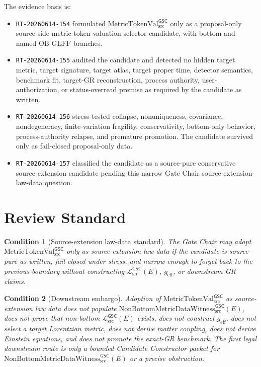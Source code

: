 \documentclass[11pt]{article}
\newcommand{\MetricTokenVal}{\mathrm{MetricTokenVal}_{\mathrm{src}}^{\mathsf{GSC}}}
\newcommand{\MetricData}{\mathcal{L}_{\mathrm{src}}^{\mathsf{GSC}}}
\newcommand{\Witness}{\mathrm{NonBottomMetricDataWitness}_{\mathrm{src}}^{\mathsf{GSC}}}
\newcommand{\OBGEFF}{\mathrm{OB\mbox{-}GEFF}}
\newcommand{\geff}{g_{\mathrm{eff}}}
\newtheorem{condition}{Condition}
\begin{document}
The evidence basis is:
\begin{itemize}[leftmargin=*]
  \item \texttt{RT-20260614-154} formulated \(\MetricTokenVal\) only as a
  proposal-only source-side metric-token valuation selector candidate, with
  bottom and named \(\OBGEFF\) branches.
  \item \texttt{RT-20260614-155} audited the candidate and detected no
  hidden target metric, target signature, target atlas, target proper time,
  detector semantics, benchmark fit, target-GR reconstruction, process
  authority, user-authorization, or status-overread premise as required by
  the candidate as written.
  \item \texttt{RT-20260614-156} stress-tested collapse, nonuniqueness,
  covariance, nondegeneracy, finite-variation fragility, conservativity,
  bottom-only behavior, process-authority relapse, and premature promotion.
  The candidate survived only as fail-closed proposal-only data.
  \item \texttt{RT-20260614-157} classified the candidate as a source-pure
  conservative source-extension candidate pending this narrow Gate Chair
  source-extension-law-data question.
\end{itemize}

\section{Review Standard}

\begin{condition}[Source-extension law-data standard]
The Gate Chair may adopt \(\MetricTokenVal\) only as source-extension law
data if the candidate is source-pure as written, fail-closed under stress,
and narrow enough to forget back to the previous boundary without constructing
\(\MetricData(E)\), \(\geff\), or downstream GR claims.
\end{condition}

\begin{condition}[Downstream embargo]
Adoption of \(\MetricTokenVal\) as source-extension law data does not populate
\(\Witness(E)\), does not prove that non-bottom \(\MetricData(E)\) exists,
does not construct \(\geff\), does not select a target Lorentzian metric, does
not derive matter coupling, does not derive Einstein equations, and does not
promote the exact-GR benchmark. The first legal downstream route is only a
bounded Candidate Constructor packet for \(\Witness(E)\) or a precise
obstruction.
\end{condition}
\end{document}

